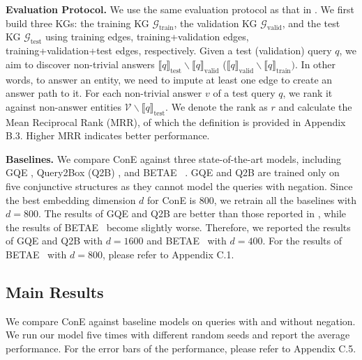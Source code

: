 \documentclass{article}
\newcommand{\ttrain}{\text{train}}
\newcommand{\tvalid}{\text{valid}}
\newcommand{\ttest}{\text{test}}
\newcommand{\betae}{{\normalsize{B}\footnotesize{ETA}\normalsize{E}}}
\begin{document}
\textbf{Evaluation Protocol.} We use the same evaluation protocol as that in \citet{beta}. We first build three KGs: the training KG $\mathcal{G}_{\ttrain}$, the validation KG $\mathcal{G}_{\tvalid}$, and the test KG $\mathcal{G}_{\ttest}$ using training edges, training+validation edges, training+validation+test edges, respectively. Given a test (validation) query $q$, we aim to discover non-trivial answers $\llbracket q\rrbracket_{\ttest}\backslash \llbracket q\rrbracket_{\tvalid}$ ($\llbracket q\rrbracket_{\tvalid}\backslash \llbracket q\rrbracket_{\ttrain})$. In other words, to answer an entity, we need to impute at least one edge to create an answer path to it. For each non-trivial answer $v$ of a test query $q$, we rank it against non-answer entities $\mathcal{V}\backslash \llbracket q\rrbracket_{\ttest}$. We denote the rank as $r$ and calculate the Mean Reciprocal Rank (MRR), of which the definition is provided in Appendix B.3. Higher MRR indicates better performance.

\textbf{Baselines.} We compare ConE against three state-of-the-art models, including GQE \cite{gqe}, Query2Box (Q2B) \cite{q2b}, and \betae~ \cite{beta}. GQE and Q2B are trained only on five conjunctive structures as they cannot model the queries with negation. Since the best embedding dimension $d$ for ConE is $800$, we retrain all the baselines with $d=800$. The results of GQE and Q2B are better than those reported in \citet{beta}, while the results of \betae~ become slightly worse. Therefore, we reported the results of GQE and Q2B with $d=1600$ and \betae~ with $d=400$. For the results of \betae~ with $d=800$, please refer to Appendix C.1. 


\vspace{-1.5mm}
\subsection{Main Results}\label{sec:main_results}
\vspace{-1mm}
We compare ConE against baseline models on queries with and without negation. We run our model five times with different random seeds and report the average performance. For the error bars of the performance, please refer to Appendix C.5.
\end{document}
